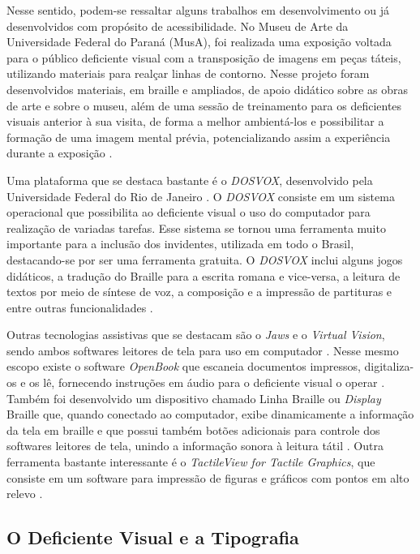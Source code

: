Nesse sentido, podem-se ressaltar alguns trabalhos em desenvolvimento ou já desenvolvidos com propósito de acessibilidade. No Museu de Arte da Universidade Federal do Paraná (MusA), foi realizada uma exposição voltada para o público deficiente visual com a transposição de imagens em peças táteis, utilizando materiais para realçar linhas de contorno. Nesse projeto foram desenvolvidos materiais, em braille e ampliados, de apoio didático sobre as obras de arte e sobre o museu, além de uma sessão de treinamento para os deficientes visuais anterior à sua visita, de forma a melhor ambientá-los e possibilitar a formação de uma imagem mental prévia, potencializando assim a experiência durante a exposição .

Uma plataforma que se destaca bastante é o \textit{DOSVOX}, desenvolvido pela Universidade Federal do Rio de Janeiro . O \textit{DOSVOX} consiste em um sistema operacional que possibilita ao deficiente visual o uso do computador para realização de variadas tarefas. Esse sistema se tornou uma ferramenta muito importante para a inclusão dos invidentes, utilizada em todo o Brasil, destacando-se por ser uma ferramenta gratuita. O \textit{DOSVOX} inclui alguns jogos didáticos, a tradução do Braille para a escrita romana e vice-versa, a leitura de textos por meio de síntese de voz, a composição e a impressão de partituras e entre outras funcionalidades .

Outras tecnologias assistivas que se destacam são o \textit{Jaws} e o \textit{Virtual Vision}, sendo ambos softwares leitores de tela para uso em computador  . Nesse mesmo escopo existe o software \textit{OpenBook} que escaneia documentos impressos, digitaliza-os e os lê, fornecendo instruções em áudio para o deficiente visual o operar .
Também foi desenvolvido um dispositivo chamado Linha Braille ou \textit{Display} Braille que, quando conectado ao computador, exibe dinamicamente a informação da tela em braille e que possui também botões adicionais para controle dos softwares leitores de tela, unindo a informação sonora à leitura tátil . Outra ferramenta bastante interessante é o \textit{TactileView for Tactile Graphics}, que consiste em um software para impressão de figuras e gráficos com pontos em alto relevo  .

\subsection{O Deficiente Visual e a Tipografia}

